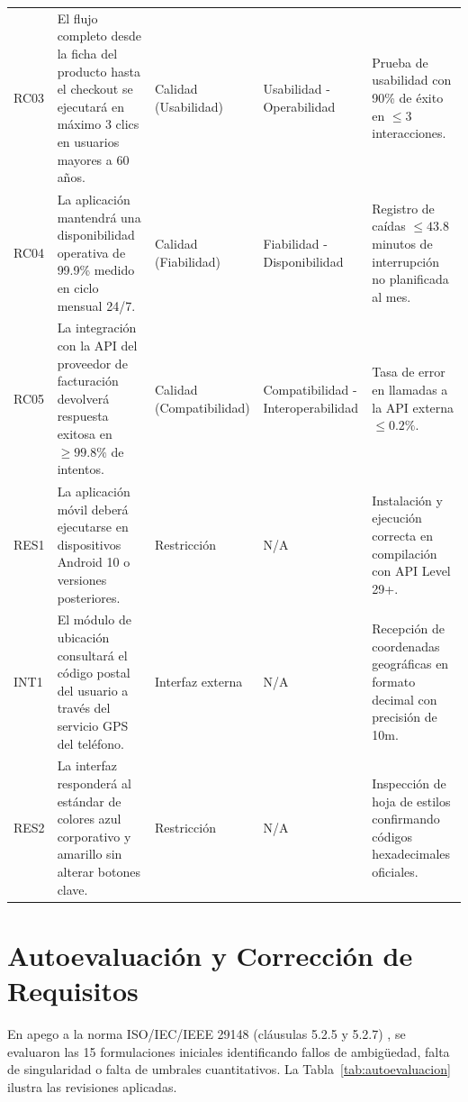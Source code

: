 \documentclass[11pt, a4paper]{article}
\begin{document}
\begin{longtable}{p{} p{} p{} p{} p{}}
RC03 & El flujo completo desde la ficha del producto hasta el checkout se ejecutará en máximo 3 clics en usuarios mayores a 60 años. & Calidad (Usabilidad) & Usabilidad - Operabilidad & Prueba de usabilidad con 90\% de éxito en $\le 3$ interacciones. \\
RC04 & La aplicación mantendrá una disponibilidad operativa de 99.9\% medido en ciclo mensual 24/7. & Calidad (Fiabilidad) & Fiabilidad - Disponibilidad & Registro de caídas $\le 43.8$ minutos de interrupción no planificada al mes. \\
RC05 & La integración con la API del proveedor de facturación devolverá respuesta exitosa en $\ge 99.8\%$ de intentos. & Calidad (Compatibilidad) & Compatibilidad - Interoperabilidad & Tasa de error en llamadas a la API externa $\le 0.2\%$. \\
RES1 & La aplicación móvil deberá ejecutarse en dispositivos Android 10 o versiones posteriores. & Restricción & N/A & Instalación y ejecución correcta en compilación con API Level 29+. \\
INT1 & El módulo de ubicación consultará el código postal del usuario a través del servicio GPS del teléfono. & Interfaz externa & N/A & Recepción de coordenadas geográficas en formato decimal con precisión de 10m. \\
RES2 & La interfaz responderá al estándar de colores azul corporativo y amarillo sin alterar botones clave. & Restricción & N/A & Inspección de hoja de estilos confirmando códigos hexadecimales oficiales. \\
\end{longtable}
\normalsize

\section{Autoevaluación y Corrección de Requisitos}

En apego a la norma ISO/IEC/IEEE 29148 (cláusulas 5.2.5 y 5.2.7) \cite{iso29148}, se evaluaron las 15 formulaciones iniciales identificando fallos de ambigüedad, falta de singularidad o falta de umbrales cuantitativos. La Tabla~\ref{tab:autoevaluacion} ilustra las revisiones aplicadas.
\end{document}

